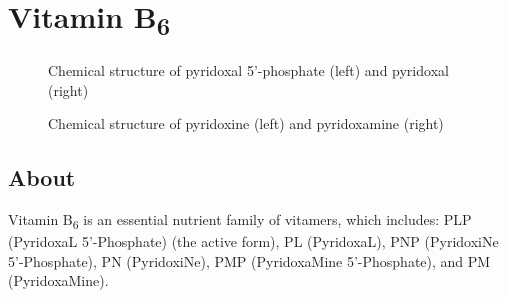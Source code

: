 \documentclass{book}
\begin{document}
\chapter{Vitamin B\textsubscript{6}}
\begin{figure}[h]
	\caption{Chemical structure of pyridoxal 5'-phosphate (left) and pyridoxal (right)}
\end{figure}
\begin{figure}[h]
	\caption{Chemical structure of pyridoxine (left) and pyridoxamine (right)}
\end{figure}
\newpage

\section{About}
Vitamin B\textsubscript{6} is an essential nutrient family of vitamers, which includes: PLP (PyridoxaL 5'-Phosphate) (the active form), PL (PyridoxaL), PNP (PyridoxiNe 5'-Phosphate), PN (PyridoxiNe), PMP (PyridoxaMine 5'-Phosphate), and PM (PyridoxaMine).
\end{document}
